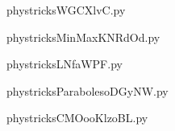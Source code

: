     

    \clearpage
    


    \newcommand{\CaptionFigWGCXlvC}{<+Type your caption here+>}
    \begin{center}
        
    \end{center}
    phystricksWGCXlvC.py

    

    \clearpage
    


    \newcommand{\CaptionFigMinMaxKNRdOd}{<+Type your caption here+>}
    \begin{center}
        
    \end{center}
    phystricksMinMaxKNRdOd.py

    

    \clearpage
    


    \newcommand{\CaptionFigLNfaWPF}{<+Type your caption here+>}
    \begin{center}
        
    \end{center}
    phystricksLNfaWPF.py

    

    \clearpage
    


    \newcommand{\CaptionFigParabolesoDGyNW}{<+Type your caption here+>}
    \begin{center}
        
    \end{center}
    phystricksParabolesoDGyNW.py

    

    \clearpage
    


    \newcommand{\CaptionFigCMOooKlzoBL}{<+Type your caption here+>}
    \begin{center}
        
    \end{center}
    phystricksCMOooKlzoBL.py

    

    \clearpage
    


